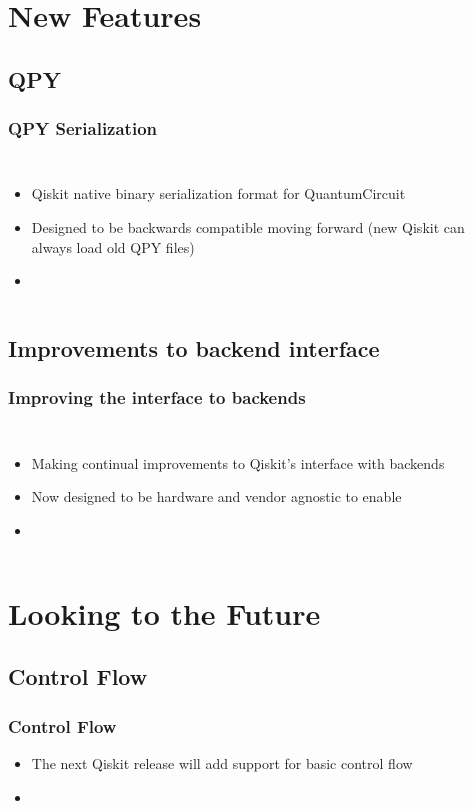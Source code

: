 \documentclass[aspectratio=169,11pt,hyperref={colorlinks=true}]{beamer}
\begin{document}
\section{New Features}
\subsection{QPY}
\begin{frame}
    \frametitle{QPY Serialization}
    \begin{columns}
            \begin{itemize}
                \item Qiskit native binary serialization format for QuantumCircuit
                \item Designed to be backwards compatible moving forward (new Qiskit can always load old QPY files)
                \item 
            \end{itemize}
            \inputminted[fontsize=\tiny]{python}{qpy_demo.py}
    \end{columns}
\end{frame}

\subsection{Improvements to backend interface}
\begin{frame}
    \frametitle{Improving the interface to backends}
    \begin{columns}
            \begin{itemize}
                \item Making continual improvements to Qiskit's interface with
                    backends
                \item Now designed to be hardware and vendor agnostic to enable
                \item 
            \end{itemize}
            \inputminted[fontsize=\tiny]{python}{backend_demo.py} 
    \end{columns}
\end{frame}

\section{Looking to the Future}
\subsection{Control Flow}
\begin{frame}
    \frametitle{Control Flow}
    \begin{itemize}
        \item The next Qiskit release will add support for basic control flow
        \item
    \end{itemize}
\end{frame}
\end{document}
